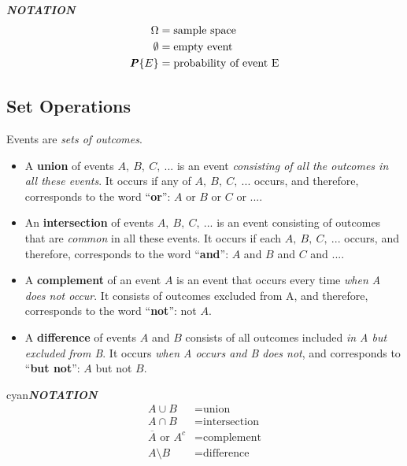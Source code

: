 \documentclass{article}
\newenvironment{formula}[1]{\begin{mybox}{cyan}{\textbf{#1}}}{\end{mybox}}
\begin{document}
\textbf{\textit{NOTATION}}
\begin{align*}
    \Omega &= \text{sample space}\\
    \emptyset &= \text{empty event}\\
    \textbf{\textit{P}}\{E\} &= \text{probability of event E}
\end{align*}


\subsection{Set Operations}

Events are \textit{sets of outcomes}.
\begin{itemize}
    \item A \textbf{union} of events $A,\ B,\ C,\ ...$ is an event \textit{consisting of all the outcomes in all these events}. It occurs if any of $A,\ B,\ C,\ ...$ occurs, and therefore, corresponds to the word ``\textbf{or}'': $A$ or $B$ or $C$ or ....
    \item An \textbf{intersection} of events $A,\ B,\ C,\ ...$ is an event consisting of outcomes that are \textit{common} in all these events. It occurs if each $A,\ B,\ C,\ ...$ occurs, and therefore, corresponds to the word ``\textbf{and}'': $A$ and $B$ and $C$ and ....
    \item A \textbf{complement} of an event $A$ is an event that occurs every time \textit{when A does not occur}. It consists of outcomes excluded from A, and therefore, corresponds to the word ``\textbf{not}'': not $A$.
    \item A \textbf{difference} of events $A$ and $B$ consists of all outcomes included \textit{in A but excluded from B}. It occurs \textit{when A occurs and B does not}, and corresponds to ``\textbf{but not}'': $A$ but not $B$.
\end{itemize}

\begin{formula}{\textit{NOTATION}}
\begin{align*}
    A \cup B &= \text{union}\\
    A \cap B &= \text{intersection}\\
    \overline{A} \text{ or } A^{c} &= \text{complement}\\
    A \setminus B &= \text{difference}
\end{align*}
\end{formula}
\end{document}
